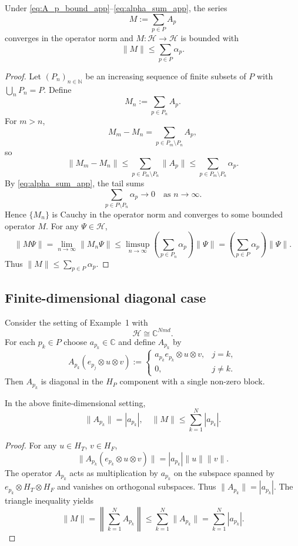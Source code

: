 \documentclass[11pt]{article}
\begin{document}
\begin{lemma}[Norm bound for $M = \sum_{p \in P} A_p$]
Under \eqref{eq:A_p_bound_app}--\eqref{eq:alpha_sum_app}, the series
\[
  M := \sum_{p \in P} A_p
\]
converges in the operator norm and $M : \mathcal{H} \to \mathcal{H}$ is bounded with
\begin{equation}
  \|M\| \leq \sum_{p \in P} \alpha_p.
\end{equation}
\end{lemma}

\begin{proof}
Let $(P_n)_{n \in \mathbb{N}}$ be an increasing sequence of finite subsets of $P$ with $\bigcup_n P_n = P$. Define
\[
  M_n := \sum_{p \in P_n} A_p.
\]
For $m > n$,
\[
  M_m - M_n = \sum_{p \in P_m \setminus P_n} A_p,
\]
so
\[
  \|M_m - M_n\|
  \leq
  \sum_{p \in P_m \setminus P_n} \|A_p\|
  \leq
  \sum_{p \in P_m \setminus P_n} \alpha_p.
\]
By \eqref{eq:alpha_sum_app}, the tail sums
\[
  \sum_{p \in P \setminus P_n} \alpha_p \to 0 \quad \text{as } n \to \infty.
\]
Hence $\{M_n\}$ is Cauchy in the operator norm and converges to some bounded operator $M$. For any $\Psi \in \mathcal{H}$,
\[
  \|M\Psi\|
  =
  \lim_{n \to \infty} \|M_n \Psi\|
  \leq
  \limsup_{n \to \infty}
  \left( \sum_{p \in P_n} \alpha_p \right)\|\Psi\|
  =
  \left( \sum_{p \in P} \alpha_p \right) \|\Psi\|.
\]
Thus $\|M\| \leq \sum_{p \in P} \alpha_p$.
\end{proof}

\subsection{Finite-dimensional diagonal case}

Consider the setting of Example~1 with
\[
  \mathcal{H} \cong \mathbb{C}^{Nmd}.
\]
For each $p_k \in P$ choose $a_{p_k} \in \mathbb{C}$ and define $A_{p_k}$ by
\[
  A_{p_k}(e_{p_j} \otimes u \otimes v)
  :=
  \begin{cases}
    a_{p_k} e_{p_k} \otimes u \otimes v, & j = k, \\
    0, & j \neq k.
  \end{cases}
\]
Then $A_{p_k}$ is diagonal in the $H_P$ component with a single non-zero block.

\begin{lemma}
In the above finite-dimensional setting,
\[
  \|A_{p_k}\| = |a_{p_k}|,\quad
  \|M\| \leq \sum_{k=1}^N |a_{p_k}|.
\]
\end{lemma}

\begin{proof}
For any $u \in H_T$, $v \in H_F$,
\[
  \|A_{p_k}(e_{p_k} \otimes u \otimes v)\|
  =
  |a_{p_k}|\|u\|\|v\|.
\]
The operator $A_{p_k}$ acts as multiplication by $a_{p_k}$ on the subspace spanned by $e_{p_k} \otimes H_T \otimes H_F$ and vanishes on orthogonal subspaces. Thus $\|A_{p_k}\| = |a_{p_k}|$. The triangle inequality yields
\[
  \|M\| = \left\|\sum_{k=1}^N A_{p_k}\right\|
  \leq
  \sum_{k=1}^N \|A_{p_k}\|
  =
  \sum_{k=1}^N |a_{p_k}|.
\]
\end{proof}
\end{document}
